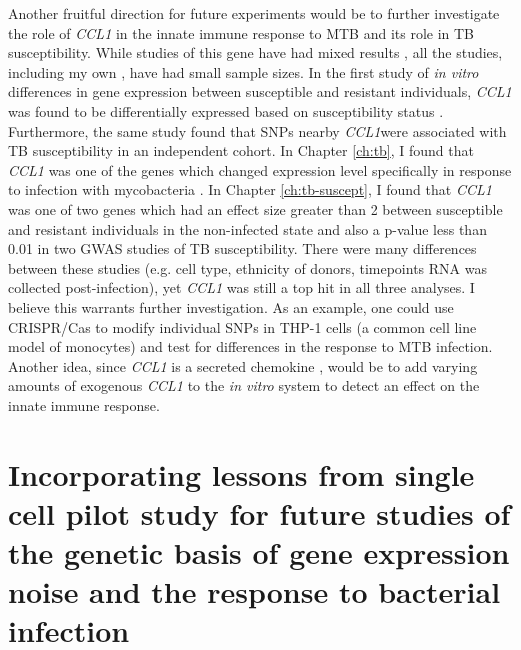 Another fruitful direction for future experiments would be to further
investigate the role of \emph{CCL1} in the innate immune response to
MTB and its role in TB susceptibility. While studies of this gene have
had mixed results \citep{Thuong2008, Tang2011, Ozdemir2013},
all the studies, including my own \citep{Blischak2015}, have had small
sample sizes. In the first study of \emph{in vitro} differences in
gene expression between susceptible and resistant individuals,
\emph{CCL1} was found to be differentially expressed based on
susceptibility status \citep{Thuong2008}. Furthermore, the same study
found that SNPs nearby \emph{CCL1}were associated with TB
susceptibility in an independent cohort. In Chapter \ref{ch:tb}, I
found that \emph{CCL1} was one of the genes which changed expression
level specifically in response to infection with mycobacteria \citep{Blischak2015}. In
Chapter \ref{ch:tb-suscept}, I found that \emph{CCL1} was one of two
genes which had an effect size greater than 2 between susceptible and
resistant individuals in the non-infected state and also a p-value less
than 0.01 in two GWAS studies of TB susceptibility. There were many
differences between these studies (e.g. cell type, ethnicity of
donors, timepoints RNA was collected post-infection), yet \emph{CCL1}
was still a top hit in all three analyses. I believe this warrants
further investigation. As an example, one could use CRISPR/Cas to
modify individual SNPs in THP-1 cells (a common cell line model of
monocytes) and test for differences in the response to MTB
infection. Another idea, since \emph{CCL1} is a secreted chemokine \citep{Miller1992},
would be to add varying amounts of exogenous \emph{CCL1} to the
\emph{in vitro} system to detect an effect on the innate immune
response.

\section{Incorporating lessons from single cell pilot study for future studies of the genetic basis of gene expression noise and the response to bacterial infection}

